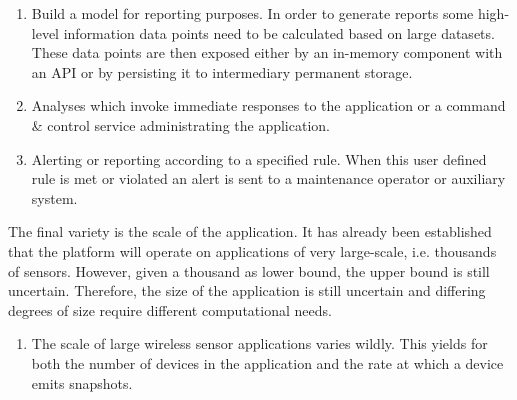 \begin{enumerate}[label=V\archid .\arabic*]
\begin{enumerate}
\nospace
\item Build a model for reporting purposes. In order to generate reports some high-level information data points need to be calculated based on large datasets. These data points are then exposed either by an in-memory component with an API or by persisting it to intermediary permanent storage.
\item Analyses which invoke immediate responses to the application or a command \& control service administrating the application.
\item Alerting or reporting according to a specified rule. When this user defined rule is met or violated an alert is sent to a maintenance operator or auxiliary system.
\end{enumerate}
\end{enumerate}
The final variety is the scale of the application. It has already been established that the platform will operate on applications of very large-scale, i.e. thousands of sensors. However, given a thousand as lower bound, the upper bound is still uncertain. Therefore, the size of the application is still uncertain and differing degrees of size require different computational needs.
\begin{enumerate}[label=V\archid .\arabic* , resume]
\nospace
\item \label{v:scale} The scale of large wireless sensor applications varies wildly. This yields for both the number of devices in the application and the rate at which a device emits snapshots.
\end{enumerate}
